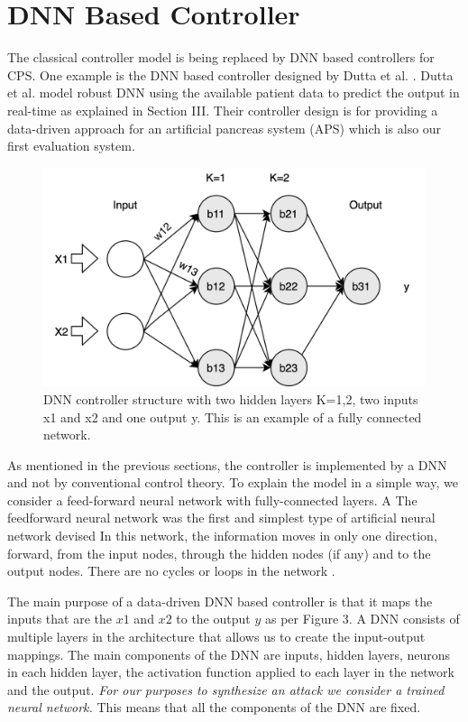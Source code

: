 \section{DNN Based Controller}
The classical controller model is being replaced by DNN based controllers for CPS. One example is the DNN based controller designed by Dutta et al. \cite{Dutta_Others__2018__Robust}. Dutta et al. model robust DNN using the available patient data to predict the output in real-time as explained in Section III. Their controller design is for providing a data-driven approach for an artificial pancreas system (APS) which is also our first evaluation system.
\begin{figure}
	\centering
	\includegraphics[width=0.7\linewidth]{Images/DNNstructure}
	\caption[DNN structure]{DNN controller structure with two hidden layers K=1,2, two inputs x1 and x2 and one output y. This is an example of a fully connected network.}
	\label{fig:dnn-controller}
\end{figure}

As mentioned in the previous sections, the controller is implemented by a DNN and not by conventional control theory. To explain the model in a simple way, we consider a feed-forward neural network with fully-connected layers. A The feedforward neural network was the first and simplest type of artificial neural network devised \cite{feedforward} In this network, the information moves in only one direction, forward, from the input nodes, through the hidden nodes (if any) and to the output nodes. There are no cycles or loops in the network \cite{Zell}.

The main purpose of a data-driven DNN based controller is that it maps the inputs that are the $x1$ and $x2$ to the output $y$ as per Figure 3. A DNN consists of multiple layers in the architecture that allows us to create the input-output mappings. The main components of the DNN are inputs, hidden layers, neurons in each hidden layer, the activation function applied to each layer in the network and the output. \textit{For our purposes to synthesize an attack we consider a trained neural network.} This means that all the components of the DNN are fixed.

